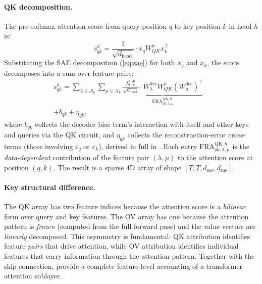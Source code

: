 \documentclass{article} %
\theoremstyle{plain}
\theoremstyle{definition}
\theoremstyle{remark}
\newcommand{\WQK}{W_{QK}}
\newcommand{\dhead}{d_{\mathrm{head}}}
\newcommand{\dsae}{d_{\mathrm{sae}}}
\begin{document}
\paragraph{QK decomposition.} The pre-softmax attention score from query position $q$ to key position $k$ in head $h$ is:
\begin{equation}
    s^h_{qk} = \frac{1}{\sqrt{\dhead}} \cdot x_q \WQK^h x_k^\top
    \label{eq:attn_score}
\end{equation}
Substituting the SAE decomposition (\eqref{eq:sae}) for both $x_q$ and $x_k$, the score decomposes into a sum over feature pairs:
\begin{equation}
\begin{aligned}
        s^h_{qk} = \sum_{\lambda \in \mathcal{A}_q} \sum_{\mu \in \mathcal{A}_k} \underbrace{\frac{f_q^\lambda f_k^\mu}{\sqrt{\dhead}} \cdot W^{\mathrm{dec}}_\lambda \WQK^h (W^{\mathrm{dec}}_\mu)^\top}_{\mathrm{FRA}^{\mathrm{QK},h}_{qk,\lambda,\mu}}&\\ + b_{qk} + \eta_{qk},
\end{aligned}
    \label{eq:qk_fra}
\end{equation}
where $b_{qk}$ collects the decoder bias term's interaction with itself and other keys and queries via the QK circuit, and $\eta_{qk}$ collects the reconstruction-error cross-terms (those involving $\varepsilon_q$ or $\varepsilon_k$), derived in full in . Each entry $\mathrm{FRA}^{\mathrm{QK},h}_{qk,\lambda,\mu}$ is the \emph{data-dependent} contribution of the feature pair $(\lambda, \mu)$ to the attention score at position $(q,k)$. The result is a sparse 4D array of shape $[T, T, \dsae, \dsae]$.

\paragraph{Key structural difference.} The QK array has two feature indices because the attention score is a \emph{bilinear} form over query and key features. The OV array has one because the attention pattern is \emph{frozen} (computed from the full forward pass) and the value vectors are \emph{linearly} decomposed. This asymmetry is fundamental: QK attribution identifies feature \emph{pairs} that drive attention, while OV attribution identifies individual features that carry information through the attention pattern. Together with the skip connection,  provide a complete feature-level accounting of a transformer attention sublayer.
\end{document}

